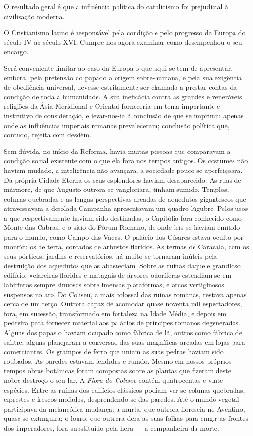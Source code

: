 \documentclass[11pt,a5paper,twoside,openany]{book}
\begin{document}
O resultado geral é que a influência política do catolicismo foi prejudicial à civilização moderna.

O Cristianismo latino é responsável pela condição e pelo progresso da Europa do século IV ao século XVI. Cumpre-nos agora examinar como desempenhou o seu encargo.

Será conveniente limitar ao caso da Europa o que aqui se tem de apresentar, embora, pela pretensão do papado a origem sobre-humana, e pela sua exigência de obediência universal, devesse estritamente ser chamado a prestar contas da condição de toda a humanidade. A sua ineficácia contra as grandes e veneráveis religiões da Ásia Meridional e Oriental forneceria um tema importante e instrutivo de consideração, e levar-nos-ia à conclusão de que se imprimiu apenas onde as influências imperiais romanas prevaleceram; conclusão política que, contudo, rejeita com desdém.

Sem dúvida, no início da Reforma, havia muitas pessoas que comparavam a condição social existente com o que ela fora nos tempos antigos. Os costumes não haviam mudado, a inteligência não avançara, a sociedade pouco se aperfeiçoara. Da própria Cidade Eterna os seus esplendores haviam desaparecido. As ruas de mármore, de que Augusto outrora se vangloriara, tinham sumido. Templos, colunas quebradas e as longas perspectivas arcadas de aquedutos gigantescos que atravessavam a desolada Campanha apresentavam um quadro lúgubre. Pelos usos a que respectivamente haviam sido destinados, o Capitólio fora conhecido como Monte das Cabras, e o sítio do Fórum Romano, de onde leis se haviam emitido para o mundo, como Campo das Vacas. O palácio dos Césares estava oculto por montículos de terra, coroados de arbustos floridos. As termas de Caracala, com os seus pórticos, jardins e reservatórios, há muito se tornaram inúteis pela destruição dos aquedutos que as abasteciam. Sobre as ruínas daquele grandioso edifício, «clareiras floridas e matagais de árvores odoríferas estendiam-se em labirintos sempre sinuosos sobre imensas plataformas, e arcos vertiginosos suspensos no ar». Do Coliseu, a mais colossal das ruínas romanas, restava apenas cerca de um terço. Outrora capaz de acomodar quase noventa mil espectadores, fora, em sucessão, transformado em fortaleza na Idade Média, e depois em pedreira para fornecer material aos palácios de príncipes romanos degenerados. Alguns dos papas o haviam ocupado como fábrica de lã, outros como fábrica de salitre; alguns planejaram a conversão das suas magníficas arcadas em lojas para comerciantes. Os grampos de ferro que uniam as suas pedras haviam sido roubados. As paredes estavam fendidas e ruindo. Mesmo em nossos próprios tempos obras botânicas foram compostas sobre as plantas que fizeram deste nobre destroço o seu lar. A \textit{Flora do Coliseu} contém quatrocentas e vinte espécies. Entre as ruínas dos edifícios clássicos podiam ver-se colunas quebradas, ciprestes e frescos mofados, desprendendo-se das paredes. Até o mundo vegetal participava da melancólica mudança: a murta, que outrora florescia no Aventino, quase se extinguira; o louro, que outrora dera as suas folhas para cingir as frontes dos imperadores, fora substituído pela hera — a companheira da morte.
\end{document}
